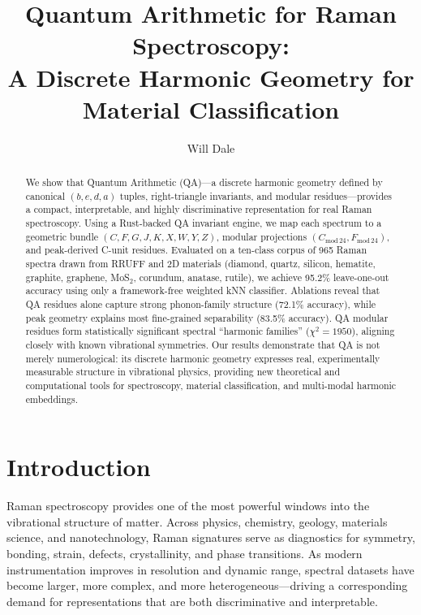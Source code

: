 \documentclass[12pt]{article}
\title{Quantum Arithmetic for Raman Spectroscopy:\\A Discrete Harmonic Geometry for Material Classification}
\author{Will Dale}
\date{}
\begin{document}
\maketitle

\begin{abstract}
We show that Quantum Arithmetic (QA)—a discrete harmonic geometry defined by canonical $(b,e,d,a)$ tuples,
right-triangle invariants, and modular residues—provides a compact, interpretable, and highly discriminative
representation for real Raman spectroscopy. Using a Rust-backed QA invariant engine, we map each spectrum to a
geometric bundle $(C,F,G,J,K,X,W,Y,Z)$, modular projections $(C_{\mathrm{mod}\,24},F_{\mathrm{mod}\,24})$, and
peak-derived C-unit residues. Evaluated on a ten-class corpus of 965 Raman spectra drawn from RRUFF and 2D
materials (diamond, quartz, silicon, hematite, graphite, graphene, MoS$_2$, corundum, anatase, rutile), we
achieve 95.2\% leave-one-out accuracy using only a framework-free weighted kNN classifier. Ablations reveal
that QA residues alone capture strong phonon-family structure (72.1\% accuracy), while peak geometry explains
most fine-grained separability (83.5\% accuracy). QA modular residues form statistically significant
spectral ``harmonic families'' ($\chi^2 = 1950$), aligning closely with known vibrational symmetries. Our
results demonstrate that QA is not merely numerological: its discrete harmonic geometry expresses real,
experimentally measurable structure in vibrational physics, providing new theoretical and computational
tools for spectroscopy, material classification, and multi-modal harmonic embeddings.
\end{abstract}

\section{Introduction}
\label{sec:intro}

Raman spectroscopy provides one of the most powerful windows into the vibrational structure of matter.
Across physics, chemistry, geology, materials science, and nanotechnology, Raman signatures serve as
diagnostics for symmetry, bonding, strain, defects, crystallinity, and phase transitions. As modern
instrumentation improves in resolution and dynamic range, spectral datasets have become larger, more
complex, and more heterogeneous—driving a corresponding demand for representations that are both
discriminative and interpretable.  
\end{document}
